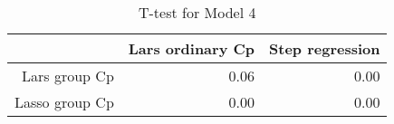 \begin{table}[ht]
\centering
\begin{tabular}{rrr}
  \hline
 & Lars ordinary Cp & Step regression \\ 
  \hline
Lars group Cp & 0.06 & 0.00 \\ 
  Lasso group Cp & 0.00 & 0.00 \\ 
   \hline
\end{tabular}
\caption{T-test for Model 4} 
\end{table}
